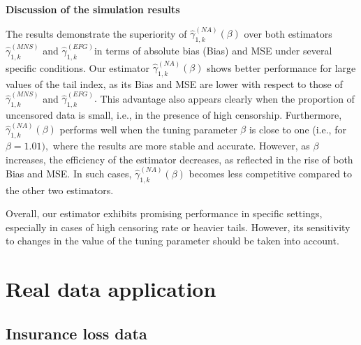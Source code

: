 \documentclass[reqno,openbib,runningheads,a4paper,12pt]{amsart}%
\begin{document}
\noindent\textbf{Discussion of the simulation results}\medskip

\noindent The results demonstrate the superiority of $\widehat{\gamma}%
_{1,k}^{\left(  NA\right)  }\left(  \beta\right)  $ over both estimators
$\widehat{\gamma}_{1,k}^{\left(  MNS\right)  }$ and $\widehat{\gamma}%
_{1,k}^{\left(  EFG\right)  }$in terms of absolute bias (Bias) and MSE under
several specific conditions. Our estimator $\widehat{\gamma}_{1,k}^{\left(
NA\right)  }\left(  \beta\right)  $ shows better performance for large values
of the tail index, as its Bias and MSE are lower with respect to those of
$\widehat{\gamma}_{1,k}^{\left(  MNS\right)  }$ and $\widehat{\gamma}%
_{1,k}^{\left(  EFG\right)  }.$ This advantage also appears clearly when the
proportion of uncensored data is small, i.e., in the presence of high
censorship. Furthermore, $\widehat{\gamma}_{1,k}^{\left(  NA\right)  }\left(
\beta\right)  $ performs well when the tuning parameter $\beta$ is close to
one (i.e., for $\beta=1.01),$ where the results are more stable and accurate.
However, as $\beta$ increases, the efficiency of the estimator decreases, as
reflected in the rise of both Bias and MSE. In such cases, $\widehat{\gamma
}_{1,k}^{\left(  NA\right)  }\left(  \beta\right)  $ becomes less competitive
compared to the other two estimators.\medskip

\noindent Overall, our estimator exhibits promising performance in specific
settings, especially in cases of high censoring rate or heavier tails.
However, its sensitivity to changes in the value of the tuning parameter
should be taken into account.

\section{\textbf{Real data application\label{sec4}}}

\subsection{Insurance loss data}
\end{document}
